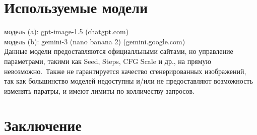 \documentclass[oneside,a4paper,14pt]{extarticle} %
\begin{document}
	\section*{Используемые модели}
	\noindent
	\indent модель (a): gpt-image-1.5 (chatgpt.com)\\
	\indent модель (b): gemini-3 (nano banana 2) (gemini.google.com)\\
	\newline
	\noindent Данные модели предоставляются официалльными сайтами, но управление параметрами, такими как Seed, Steps, CFG Scale и др., на прямую невозможно.\
	Также не гарантируется качество сгенерированных изображений, так как большинство моделей недоступны и/или не предоставляют возможность изменять паратры,
	и имеют лимиты по колличеству запросов.

	\setcounter{section}{1}
	
	
	
	
	
	
	

	\newpage
	\section*{Заключение}
\end{document}
